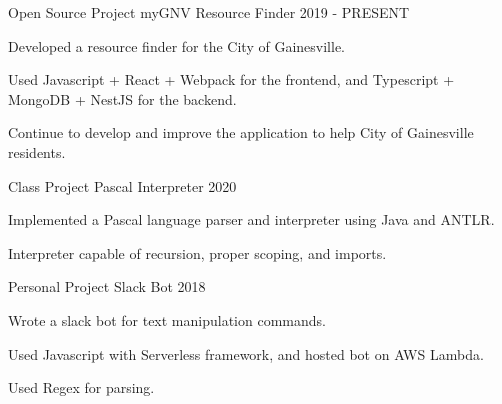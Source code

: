 

\begin{cventries}

\cventry
    {Open Source Project} %
    {myGNV Resource Finder} %
    {} %
    {2019 - PRESENT} %
    {
    \begin{cvitems} %
        \item {Developed a resource finder for the City of Gainesville.}
        \item {Used Javascript + React + Webpack for the frontend, and Typescript + MongoDB + NestJS for the backend.}
        \item {Continue to develop and improve the application to help City of Gainesville residents.}
    \end{cvitems}
    }


\cventry
{Class Project} %
{Pascal Interpreter} %
{} %
{2020} %
{
  \begin{cvitems} %
    \item {Implemented a Pascal language parser and interpreter using Java and ANTLR.}
    \item {Interpreter capable of recursion, proper scoping, and imports.}
  \end{cvitems}
}


  \cventry
    {Personal Project} %
    {Slack Bot} %
    {} %
    {2018} %
    {
      \begin{cvitems} %
        \item {Wrote a slack bot for text manipulation commands.}
        \item {Used Javascript with Serverless framework, and hosted bot on AWS Lambda.}
        \item {Used Regex for parsing.}
      \end{cvitems}
    }

\end{cventries}